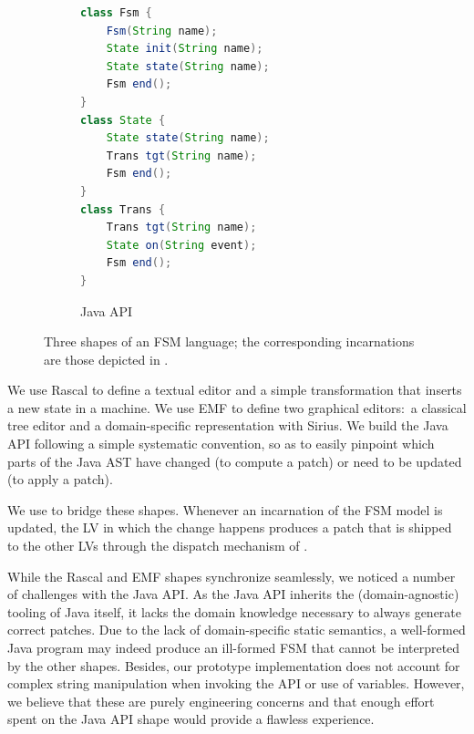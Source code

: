 \begin{figure}[bt]
	\enskip
	\vrule
	\enskip
	\begin{subfigure}[t]{.35\columnwidth}
		\vskip 0pt
		\begin{lstlisting}[label=lst:fsm-api, language=Java, numbers=none, xleftmargin=0pt, tabsize=1, aboveskip=0pt, belowskip=0pt, abovecaptionskip=0pt]
class Fsm {
	Fsm(String name);
	State init(String name);
	State state(String name);
	Fsm end();
}
class State {
	State state(String name);
	Trans tgt(String name);
	Fsm end();
}
class Trans {
	Trans tgt(String name);
	State on(String event);
	Fsm end();
}
		\end{lstlisting}
		\caption{Java API}
	\end{subfigure}
	\caption{Three shapes of an FSM language; the corresponding incarnations are those depicted in .}
	\label{fig:3fsms}
\end{figure}

We use Rascal to define a textual editor and a simple transformation that inserts a new state in a machine.
We use EMF to define two graphical editors:~a classical tree editor and a domain-specific representation with Sirius.
We build the Java API following a simple systematic convention, so as to easily pinpoint which parts of the Java AST have changed (to compute a patch) or need to be updated (to apply a patch).

We use \prism to bridge these shapes.
Whenever an incarnation of the FSM model is updated, the LV in which the change happens produces a patch that is shipped to the other LVs through the dispatch mechanism of \prism.


While the Rascal and EMF shapes synchronize seamlessly, we noticed a number of challenges with the Java API.
As the Java API inherits the (domain-agnostic) tooling of Java itself, it lacks the domain knowledge necessary to always generate correct patches.
Due to the lack of domain-specific static semantics, a well-formed Java program may indeed produce an ill-formed FSM that cannot be interpreted by the other shapes.
Besides, our prototype implementation does not account for complex string manipulation when invoking the API or use of variables.
However, we believe that these are purely engineering concerns and that enough effort spent on the Java API shape would provide a flawless experience.

